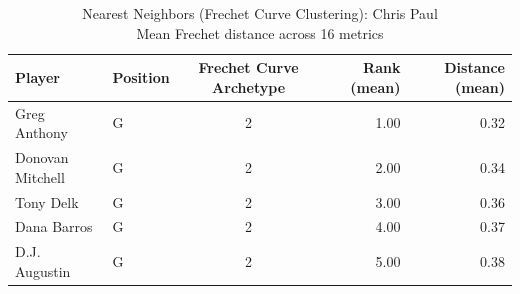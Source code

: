 \begin{table}[t]
\caption*{
{\fontsize{20}{25} Nearest Neighbors (Frechet Curve Clustering): Chris Paul\fontsize{12}{15}\selectfont } \\ 
{\fontsize{14}{17}\selectfont  Mean Frechet distance across 16 metrics\fontsize{12}{15}\selectfont }
} 
\fontsize{12.0pt}{14.0pt}\selectfont
\begin{tabular*}{\linewidth}{@{\extracolsep{\fill}}llcrr}
\toprule
Player & Position & Frechet Curve Archetype & Rank (mean) & Distance (mean) \\ 
\midrule\addlinespace[2.5pt]
Greg Anthony & G & 2 & 1.00 & 0.32 \\ 
Donovan Mitchell & G & 2 & 2.00 & 0.34 \\ 
Tony Delk & G & 2 & 3.00 & 0.36 \\ 
Dana Barros & G & 2 & 4.00 & 0.37 \\ 
D.J. Augustin & G & 2 & 5.00 & 0.38 \\ 
\bottomrule
\end{tabular*}
\end{table}

